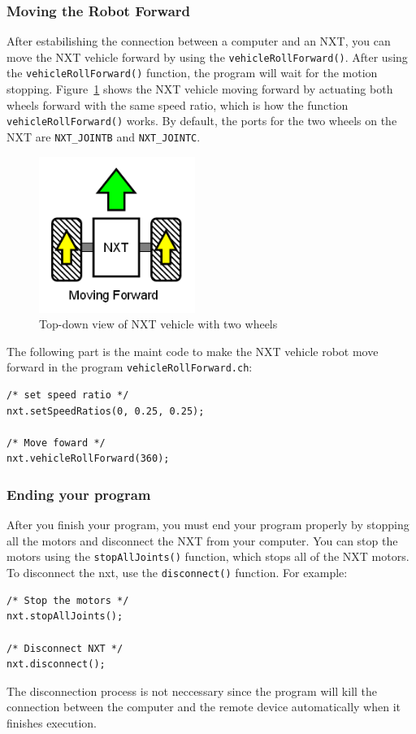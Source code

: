 \documentclass[11pt]{article}
\begin{document}
\subsubsection{Moving the Robot Forward}
After estabilishing the connection between a computer and an NXT, you can move 
the NXT vehicle forward by using the {\tt vehicleRollForward()}. After using the 
{\tt vehicleRollForward()} function, the program will wait for the motion stopping. 
Figure~\ref{fig_NXT_forward} shows the NXT vehicle moving forward by actuating 
both wheels forward with the same speed ratio, which is how the function 
{\tt vehicleRollForward()} works. By default, the ports for the two wheels on the 
NXT are {\tt NXT\_JOINTB} and {\tt NXT\_JOINTC}.
\begin{figure}[H]
  \begin{center}
    \includegraphics[height=2in]{figure/mindstorm/Vehicle_forward.png}
    \caption{Top-down view of NXT vehicle with two wheels\label{fig_NXT_forward}}
  \end{center}
\end{figure}
The following part is the maint code to make the NXT vehicle robot move forward 
in the program {\tt vehicleRollForward.ch}:
\begin{lstlisting}
/* set speed ratio */
nxt.setSpeedRatios(0, 0.25, 0.25);

/* Move foward */
nxt.vehicleRollForward(360);
\end{lstlisting}

\subsubsection{Ending your program}
After you finish your program, you must end your program properly by stopping 
all the motors and disconnect the NXT from your computer. You can stop the 
motors using the {\tt stopAllJoints()} function, which stops all of the NXT 
motors. To disconnect the nxt, use the {\tt disconnect()} function. For example:
\begin{lstlisting}
/* Stop the motors */
nxt.stopAllJoints();
    
/* Disconnect NXT */
nxt.disconnect();
\end{lstlisting}
The disconnection process is not neccessary since the program will kill the 
connection between the computer and the remote device automatically when it 
finishes execution.
\end{document}
